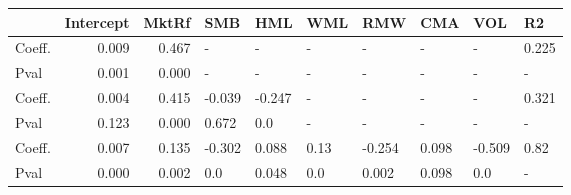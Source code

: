 \begin{tabular}{lrrlllllll}
\toprule
{} &  Intercept &  MktRf &    SMB &    HML &   WML &    RMW &    CMA &    VOL &     R2 \\
\midrule
Coeff.  &      0.009 &  0.467 &      - &      - &     - &      - &      - &      - &  0.225 \\
Pval    &      0.001 &  0.000 &      - &      - &     - &      - &      - &      - &      - \\
Coeff.  &      0.004 &  0.415 & -0.039 & -0.247 &     - &      - &      - &      - &  0.321 \\
Pval    &      0.123 &  0.000 &  0.672 &    0.0 &     - &      - &      - &      - &      - \\
Coeff.  &      0.007 &  0.135 & -0.302 &  0.088 &  0.13 & -0.254 &  0.098 & -0.509 &   0.82 \\
Pval    &      0.000 &  0.002 &    0.0 &  0.048 &   0.0 &  0.002 &  0.098 &    0.0 &      - \\
\bottomrule
\end{tabular}

